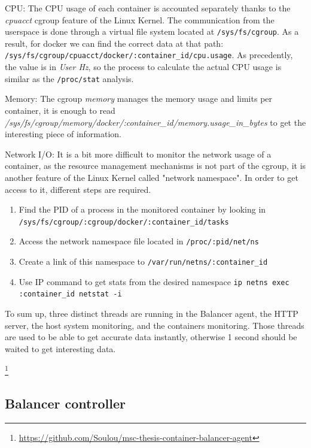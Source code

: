\begin{itemize}
\item{CPU: The CPU usage of each container is accounted separately thanks to
the \textit{cpuacct} cgroup feature of the Linux Kernel. The communication
from the userspace is done through a virtual file system located at
\texttt{/sys/fs/cgroup}. As a result, for docker we can find the correct data
at that path: \newline\texttt{/sys/fs/cgroup/cpuacct/docker/:container\_id/cpu.usage}.
As precedently, the value is in \textit{User Hz}, so the process to calculate the
actual CPU usage is similar as the \texttt{/proc/stat} analysis.
\item{Memory: The cgroup \textit{memory} manages the memory usage and limits per
container, it is enough to read
\textit{/sys/fs/cgroup/memory/docker/:container\_id/memory.usage\_in\_bytes} to get
the interesting piece of information.}}
\item{Network I/O: It is a bit more difficult to monitor the network usage of a container,
as the resource management mechanisms is not part of the cgroup, it is another feature
of the Linux Kernel called "network namespace". In order to get access to it, different
steps are required.
\begin{enumerate}
\item{Find the PID of a process in the monitored container by looking in \texttt{/sys/fs/cgroup/:cgroup/docker/:container\_id/tasks}}
\item{Access the network namespace file located in \texttt{/proc/:pid/net/ns}}
\item{Create a link of this namespace to \texttt{/var/run/netns/:container\_id}}
\item{Use IP command to get stats from the desired namespace \texttt{ip netns exec :container\_id netstat -i}}
\end{enumerate}}
\end{itemize}

To sum up, three distinct threads are running in the Balancer agent, the HTTP
server, the host system monitoring, and the containers monitoring. Those
threads are used to be able to get accurate data instantly, otherwise 1 second
should be waited to get interesting data.

\footnote{\url{https://github.com/Soulou/msc-thesis-container-balancer-agent}}

\subsection{Balancer controller}

